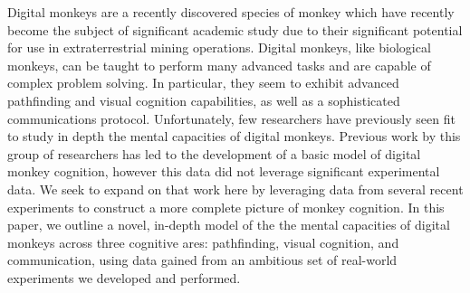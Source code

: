 Digital monkeys are a recently discovered species of monkey which have recently become the
subject of significant academic study due to their significant potential for use in
extraterrestrial mining operations.
Digital monkeys, like biological monkeys, can be taught to perform many advanced tasks and are
capable of complex problem solving.
In particular, they seem to exhibit advanced pathfinding and visual cognition capabilities, as well
as a sophisticated communications protocol.
Unfortunately, few researchers have previously seen fit to study in depth the mental capacities of
digital monkeys.
Previous work by this group of researchers has led to the development of a basic model of digital
monkey cognition\cite{sub_verif_plan}, however this data did not leverage significant experimental
data.
We seek to expand on that work here by leveraging data from several recent experiments to
construct a more complete picture of monkey cognition.
In this paper, we outline a novel, in-depth model of the the mental capacities of digital monkeys
across three cognitive ares: pathfinding, visual cognition, and communication, using data gained
from an ambitious set of real-world experiments we developed and performed.